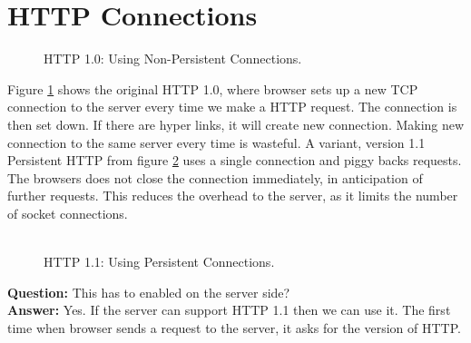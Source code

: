 \documentclass[twoside]{article}
\begin{document}
\section{HTTP Connections}
\begin{figure}[h]
\begin{center}
\caption{HTTP 1.0: Using Non-Persistent Connections.}
\label{http_1.0}
\end{center}
\end{figure}
Figure \ref{http_1.0} shows the original HTTP 1.0, where browser sets up a new TCP connection to the server every time we make a HTTP request. The connection is then set down. If there are hyper links, it will create new connection. Making new connection to the same server every time is wasteful. A variant, version 1.1 Persistent HTTP from figure \ref{http_1.1} uses a single connection and piggy backs requests. The browsers does not close the connection immediately, in anticipation of further requests. This reduces the overhead to the server, as it limits the number of socket connections.\\\\
\begin{figure}[h]
\begin{center}
\caption{HTTP 1.1: Using Persistent Connections.}
\label{http_1.1}
\end{center}
\end{figure}
\textbf{Question:} This has to enabled on the server side?\\
\textbf{Answer:} Yes. If the server can support HTTP 1.1 then we can use it. The first time when browser sends a request to the server, it asks for the version of HTTP. \\
\end{document}
